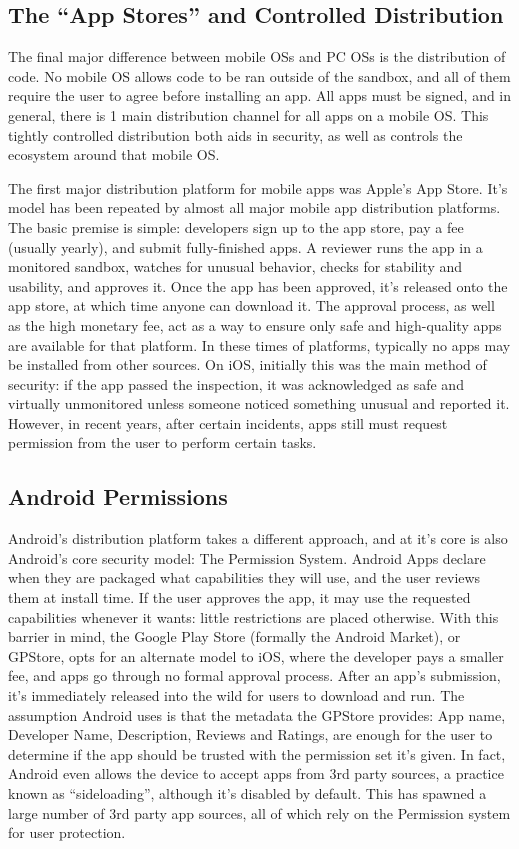 
\subsection{The ``App Stores'' and Controlled Distribution}

The final major difference between mobile OSs and PC OSs is the distribution of code. No mobile OS allows code to be ran outside of the sandbox, and all of them require the user to agree before installing an app. All apps must be signed, and in general, there is 1 main distribution channel for all apps on a mobile OS. This tightly controlled distribution both aids in security, as well as controls the ecosystem around that mobile OS.

The first major distribution platform for mobile apps was Apple's App Store\citep{AppleAppStore}. It's model has been repeated by almost all major mobile app distribution platforms. The basic premise is simple: developers sign up to the app store, pay a fee (usually yearly), and submit fully-finished apps. A reviewer runs the app in a monitored sandbox, watches for unusual behavior, checks for stability and usability, and approves it. Once the app has been approved, it's released onto the app store, at which time anyone can download it. The approval process, as well as the high monetary fee, act as a way to ensure only safe and high-quality apps are available for that platform. In these times of platforms, typically no apps may be installed from other sources. On iOS, initially this was the main method of security: if the app passed the inspection, it was acknowledged as safe and virtually unmonitored unless someone noticed something unusual and reported it. However, in recent years, after certain incidents, apps still must request permission from the user to perform certain tasks.

\subsection{Android Permissions}
Android's distribution platform takes a different approach, and at it's core is also Android's core security model: The Permission System. Android Apps declare when they are packaged what capabilities they will use, and the user reviews them at install time. If the user approves the app, it may use the requested capabilities whenever it wants: little restrictions are placed otherwise. With this barrier in mind, the Google Play Store (formally the Android Market), or GPStore, opts for an alternate model to iOS, where the developer pays a smaller fee, and apps go through no formal approval process. After an app's submission, it's immediately released into the wild for users to download and run. The assumption Android uses is that the metadata the GPStore provides: App name, Developer Name, Description, Reviews and Ratings, are enough for the user to determine if the app should be trusted with the permission set it's given. In fact, Android even allows the device to accept apps from 3rd party sources, a practice known as ``sideloading'', although it's disabled by default. This has spawned a large number of 3rd party app sources, all of which rely on the Permission system for user protection.


